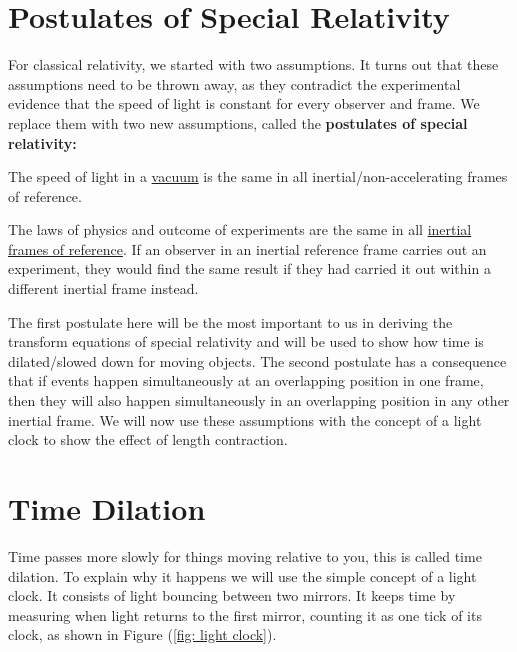 \section{Postulates of Special Relativity} \label{sect: Postulates of Special Relativity}

For classical relativity, we started with two assumptions. It turns out that these assumptions need to be thrown away, as they contradict the experimental evidence that the speed of light is constant for every observer and frame. We replace them with two new assumptions, called the \textbf{postulates of special relativity:}

\begin{mainpoints}
		\item The speed of light in a \hyperlink{def-vacuum}{vacuum} is the same in all inertial/non-accelerating frames of reference.
		\item The laws of physics and outcome of experiments are the same in all \hyperlink{def-Inertial-reference-frame}{inertial frames of reference}. If an observer in an inertial reference frame carries out an experiment, they would find the same result if they had carried it out within a different inertial frame instead.
\end{mainpoints}

The first postulate here will be the most important to us in deriving the transform equations of special relativity and will be used to show how time is dilated/slowed down for moving objects. The second postulate has a consequence that if events happen simultaneously at an overlapping position in one frame, then they will also happen simultaneously in an overlapping position in any other inertial frame.
We will now use these assumptions with the concept of a light clock to show the effect of length contraction.

\section{Time Dilation} \label{sect: Time Dilation}

Time passes more slowly for things moving relative to you, this is called time dilation.
To explain why it happens we will use the simple concept of a light clock.
It consists of light bouncing between two mirrors.
It keeps time by measuring when light returns to the first mirror, counting it as one tick of its clock, as shown in Figure (\ref{fig: light clock}).

